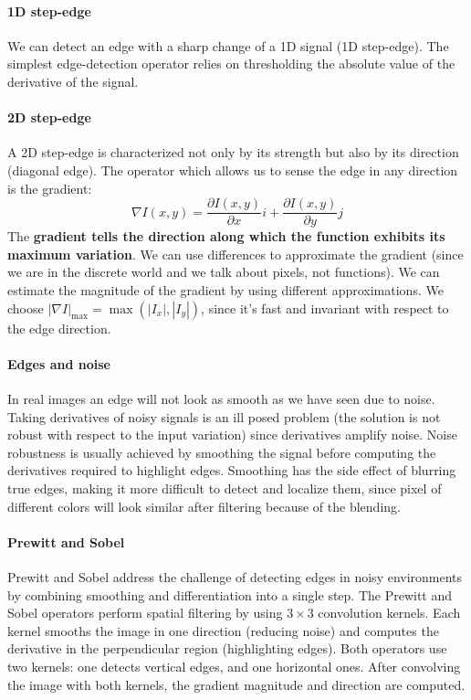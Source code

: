 \documentclass{article}
\begin{document}
\paragraph{1D step-edge}
We can detect an edge with a sharp change of a 1D signal (1D step-edge).
The simplest edge-detection operator relies on thresholding the absolute value of the derivative of the signal.

\paragraph{2D step-edge}
A 2D step-edge is characterized not only by its strength but also by its direction (diagonal edge).
The operator which allows us to sense the edge in any direction is the gradient:
$$\nabla I(x,y) = \frac{\partial I(x,y)}{\partial x}i + \frac{\partial I(x,y)}{\partial y}j$$
The \textbf{gradient tells the direction along which the function exhibits its maximum variation}.
We can use differences to approximate the gradient (since we are in the discrete world and we talk about pixels, not functions).
We can estimate the magnitude of the gradient by using different approximations.
We choose $|\nabla I|_{\max}=\max(|I_x|, |I_y|)$, since it's fast and invariant with respect to the edge direction.

\paragraph{Edges and noise}
In real images an edge will not look as smooth as we have seen due to noise.
Taking derivatives of noisy signals is an ill posed problem (the solution is not robust with respect to the input variation) since derivatives amplify noise.
Noise robustness is usually achieved by smoothing the signal before computing the derivatives required to highlight edges.
Smoothing has the side effect of blurring true edges, making it more difficult to detect and localize them, since pixel of different colors will look similar after filtering because of the blending.

\paragraph{Prewitt and Sobel}
Prewitt and Sobel address the challenge of detecting edges in noisy environments by combining smoothing and differentiation into a single step.
The Prewitt and Sobel operators perform spatial filtering by using $3 \times 3$ convolution kernels.
Each kernel smooths the image in one direction (reducing noise) and computes the derivative in the perpendicular region (highlighting edges).
Both operators use two kernels: one detects vertical edges, and one horizontal ones.
After convolving the image with both kernels, the gradient magnitude and direction are computed.
\end{document}
